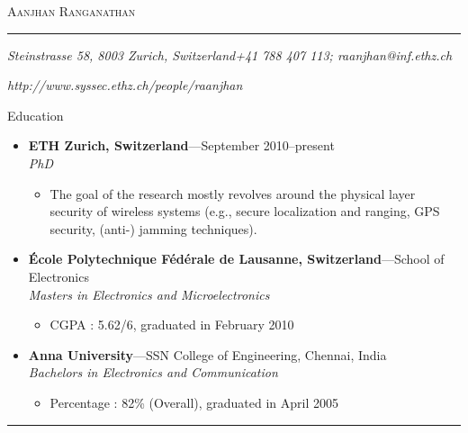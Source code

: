 \documentclass[11pt,oneside]{article}
\makeatletter
\newcommand{\name}{Aanjhan Ranganathan}
\newcommand{\addr}{Steinstrasse 58, 8003 Zurich, Switzerland}
\newcommand{\phone}{+41 788 407 113}
\newcommand{\email}{raanjhan@inf.ethz.ch}
\newcommand{\webaddr}{http://www.syssec.ethz.ch/people/raanjhan}
\newcommand{\bigname}[1]{
	\begin{center}\fontfamily{phv}\selectfont\Huge\scshape#1\end{center}
}
\newenvironment{ressection}[1]{
	\vspace{4pt}
	{\fontfamily{phv}\selectfont\Large#1}
	\begin{itemize}
	\vspace{3pt}
}{
	\end{itemize}
}
\newcommand{\ressubitem}[1]{
	\vspace{-1pt}
	\item \begin{flushleft} #1 \end{flushleft}
}
\newcommand{\resbigitem}[3]{
	\vspace{-5pt}
	\item
	\textbf{#1}---#2 \\
	\textit{#3}
}
\newenvironment{ressubsec}[3]{
	\resbigitem{#1}{#2}{#3}
	\vspace{-2pt}
	\begin{itemize}
}{
	\end{itemize}
}
\makeatother
\begin{document}
 \selectfont

\bigname{\name}

\vspace{-8pt} \rule{\textwidth}{1pt}

\vspace{-1pt} {\small\itshape \addr \hfill \phone; \email}

\vspace{-1pt} {\small\itshape \hfill \webaddr}

\vspace{8 pt}


\begin{ressection}{Education}
	\begin{ressubsec}{ETH Zurich, Switzerland}{September 2010--present}{PhD}
  		\ressubitem{The goal of the research mostly revolves around the physical layer security of wireless systems (e.g., secure localization and ranging, GPS security, (anti-) jamming techniques).}
  		\end{ressubsec}
    \begin{ressubsec}{\'{E}cole Polytechnique F\'{e}d\'{e}rale de Lausanne, Switzerland}{School of Electronics}{Masters in Electronics and Microelectronics}
		\ressubitem{CGPA : 5.62/6, graduated in February 2010}
	\end{ressubsec}
	\begin{ressubsec}{Anna University}{SSN College of Engineering, Chennai, India}{Bachelors in Electronics and Communication}
		\ressubitem{Percentage : 82\% (Overall), graduated in April 2005 }
	\end{ressubsec}
\end{ressection}
\rule{\textwidth}{.5pt}
\end{document}
